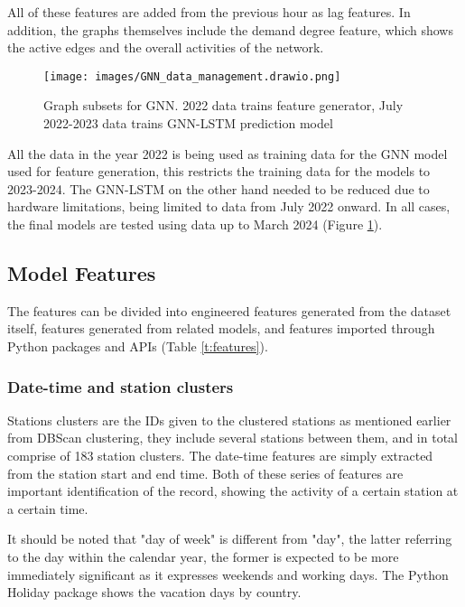 \documentclass{article}
\begin{document}
All of these features are added from the previous hour as lag features. In addition, the graphs themselves include the demand degree feature, which shows the active edges and the overall activities of the network.


\begin{figure}
\hspace*{0.5cm}  
\texttt{[image: images/GNN\_data\_management.drawio.png]}
\caption{Graph subsets for GNN. 2022 data trains feature generator, July 2022-2023 data trains GNN-LSTM prediction model}
\label{fig:gnn_data_management}
\end{figure}


All the data in the year 2022 is being used as training data for the GNN model used for feature generation, this restricts the training data for the models to 2023-2024. The GNN-LSTM on the other hand needed to be reduced due to hardware limitations, being limited to data from July 2022 onward. In all cases, the final models are tested using data up to March 2024 (Figure \ref{fig:gnn_data_management}).

\subsection{Model Features}

The features can be divided into engineered features generated from the dataset itself, features generated from related models, and features imported through Python packages and APIs (Table \ref{t:features}).

\subsubsection{Date-time and station clusters}

Stations clusters are the IDs given to the clustered stations as mentioned earlier from DBScan clustering, they include several stations between them, and in total comprise of 183 station clusters. The date-time features are simply extracted from the station start and end time. Both of these series of features are important identification of the record, showing the activity of a certain station at a certain time.

It should be noted that "day of week" is different from "day", the latter referring to the day within the calendar year, the former is expected to be more immediately significant as it expresses weekends and working days. The Python Holiday package shows the vacation days by country.
\end{document}
